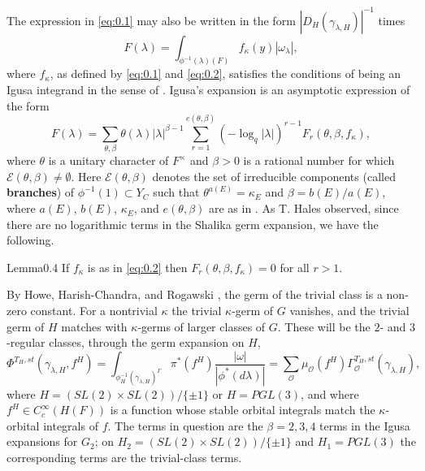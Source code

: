 \documentclass[12pt,letterpaper]{amsart}
\theoremstyle{plain}
\theoremstyle{definition}
\theoremstyle{remark}
\theoremstyle{definition}
\begin{document}
The expression in \eqref{eq:0.1} may also be written in
the form $|D_H(\gamma_{\lambda,H})|^{-1}$ times
\begin{equation}\tag{0.2}\label{eq:0.2}
F(\lambda)=\int_{\phi^{-1}(\lambda)(F)}f_\kappa(y)|\omega_\lambda|,
\end{equation}
where $f_\kappa$, as defined by \eqref{eq:0.1} and \eqref{eq:0.2},
satisfies the conditions of being an Igusa integrand
in the sense of \cite{La83}. Igusa's expansion
\cite{La83} is an asymptotic expression of the form
\begin{equation}\tag{0.3}\label{eq:0.3}
F(\lambda) =\sum_{\theta,\beta}\theta(\lambda)|\lambda|^{\beta -1}
\sum_{r=1}^{e(\theta,\beta)}(-\log_q|\lambda|)^{r-1}F_r(\theta,\beta,f_\kappa),
\end{equation}
where $\theta$ is a unitary character of $F^{\times}$ and $\beta >0$
is a rational number for which ${\mathcal E}(\theta,\beta)\not= \emptyset$.
Here ${\mathcal E}(\theta,\beta)$ denotes the set of irreducible components
(called \textbf{branches}) of $\phi^{-1}(1)\subset Y_C$ such that
$\theta^{a(E)}=\kappa_E$ and $\beta=b(E)/a(E)$, where $a(E)$, $b(E)$,
$\kappa_E$, and $e(\theta,\beta)$ are as in \cite{La83}. As T. Hales
observed, since there are no logarithmic terms in the
Shalika germ expansion, we have the following.

\begin{res}{Lemma}{0.4}\label{res:0.4}
If $f_\kappa$ is as in \eqref{eq:0.2} then
$F_r(\theta,\beta,f_\kappa)=0$
for all $r>1$.
\end{res}

By Howe, Harish-Chandra, and
Rogawski \cite{Ro80}, the germ of the trivial class is a non-zero constant.
For a nontrivial $\kappa$ the trivial $\kappa$-germ of $G$ vanishes, and the
trivial germ of $H$ matches with $\kappa$-germs of larger classes of $G$.
These will be the $2$- and $3$-regular classes, through the germ expansion on
$H$,
\begin{equation}\tag{0.5}\label{eq:0.5}
\Phi^{T_H,st}(\gamma_{\lambda,H},f^H)
=\int_{\phi_H^{-1}(\gamma_{\lambda,H})^\Gamma}\pi^*(f^H)
\frac{|\omega|}{|\phi^*(d\lambda)|}
=\sum_{{\mathcal O}}\mu_{\mathcal O}(f^H)
\Gamma_{{\mathcal O}}^{T_H,st}(\gamma_{\lambda,H}),
\end{equation}
where $H=(SL(2)\times SL(2))/\{\pm 1\}$ or $H=PGL(3)$, and where
$f^H\in C_c^\infty(H(F))$ is a function whose stable orbital integrals
match the $\kappa$-orbital integrals of $f$.
The terms in question are the $\beta =2,3,4$ terms in the Igusa expansions
for $G_2$; on $H_2=(SL(2)\times SL(2))/\{\pm 1\}$ and $H_1=PGL(3)$ the
corresponding terms are the trivial-class terms.
\end{document}
